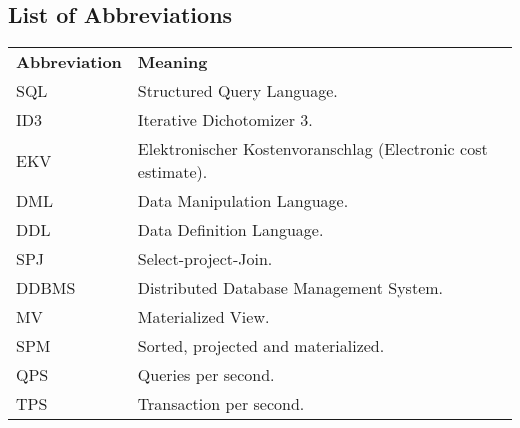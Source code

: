 
% 

\begin{center}
    \section*{List of Abbreviations}
\end{center}

\noindent %
\begin{minipage}{\textwidth}
\begin{tabular}{ll}
    \textbf{Abbreviation} & \textbf{Meaning} \\
    SQL & Structured Query Language. \\
    ID3 & Iterative  Dichotomizer 3. \\
    EKV & Elektronischer Kostenvoranschlag (Electronic cost estimate).\\
    DML & Data Manipulation Language. \\
    DDL & Data Definition Language.\\
    SPJ & Select-project-Join.\\
    DDBMS & Distributed Database Management System.\\
    MV & Materialized View.\\
    SPM & Sorted, projected and materialized.\\
    QPS & Queries per second.\\
    TPS & Transaction per second.\\
\end{tabular}
\end{minipage}
% 

    